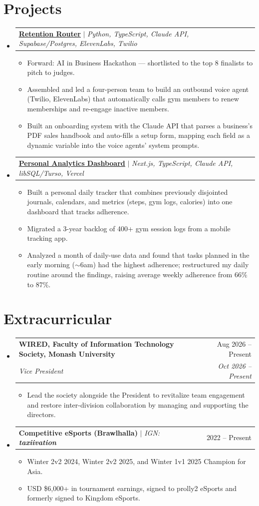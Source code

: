 \documentclass[letterpaper,11pt]{article}
\makeatletter
\newcommand{\resumeItem}[1]{\item\small{{#1 \vspace{-2pt}}}}
\newcommand{\resumeSubheading}[4]{
  \vspace{-2pt}\item
    \begin{tabular*}{0.97\textwidth}[t]{l@{\extracolsep{\fill}}r}
      \textbf{#1} & #2 \\
      \textit{\small#3} & \textit{\small #4} \\
    \end{tabular*}\vspace{-7pt}
}
\newcommand{\resumeProjectHeading}[2]{
    \item
    \begin{tabular*}{0.97\textwidth}{l@{\extracolsep{\fill}}r}
      \small#1 & #2 \\
    \end{tabular*}\vspace{-7pt}
}
\newcommand{\resumeSubHeadingListStart}{\begin{itemize}[leftmargin=0.15in, label={}]}
\newcommand{\resumeSubHeadingListEnd}{\end{itemize}}
\newcommand{\resumeItemListStart}{\begin{itemize}[itemsep=0pt]}
\newcommand{\resumeItemListEnd}{\end{itemize}\vspace{-5pt}}
\makeatother
\begin{document}
\section{Projects}
    \resumeSubHeadingListStart
      \resumeProjectHeading
          {\textbf{\href{https://github.com/taxiivation-hfp/retention-router}{\underline{Retention Router}}} $|$ \emph{Python, TypeScript, Claude API, Supabase/Postgres, ElevenLabs, Twilio}}{}
          \resumeItemListStart
            \resumeItem{Forward: AI in Business Hackathon --- shortlisted to the top 8 finalists to pitch to judges.}
            \resumeItem{Assembled and led a four-person team to build an outbound voice agent (Twilio, ElevenLabs) that automatically calls gym members to renew memberships and re-engage inactive members.}
            \resumeItem{Built an onboarding system with the Claude API that parses a business's PDF sales handbook and auto-fills a setup form, mapping each field as a dynamic variable into the voice agents' system prompts.}
          \resumeItemListEnd
      \resumeProjectHeading
          {\textbf{\href{https://github.com/taxiivation-hfp/personal-dashboard}{\underline{Personal Analytics Dashboard}}} $|$ \emph{Next.js, TypeScript, Claude API, libSQL/Turso, Vercel}}{}
          \resumeItemListStart
            \resumeItem{Built a personal daily tracker that combines previously disjointed journals, calendars, and metrics (steps, gym logs, calories) into one dashboard that tracks adherence.}
            \resumeItem{Migrated a 3-year backlog of 400+ gym session logs from a mobile tracking app.}
            \resumeItem{Analyzed a month of daily-use data and found that tasks planned in the early morning ($\sim$6am) had the highest adherence; restructured my daily routine around the findings, raising average weekly adherence from 66\% to 87\%.}
          \resumeItemListEnd
    \resumeSubHeadingListEnd

\section{Extracurricular}
  \resumeSubHeadingListStart

    \resumeSubheading
      {WIRED, Faculty of Information Technology Society, Monash University}{Aug 2026 -- Present}
      {Vice President}{Oct 2026 -- Present}
      \resumeItemListStart
        \resumeItem{Lead the society alongside the President to revitalize team engagement and restore inter-division collaboration by managing and supporting the directors.}
      \resumeItemListEnd
    \resumeProjectHeading{\textbf{Competitive eSports (Brawlhalla)} $|$ \emph{IGN: \textbf{taxiivation}}}{2022 -- Present}
      \resumeItemListStart
        \resumeItem{Winter 2v2 2024, Winter 2v2 2025, and Winter 1v1 2025 Champion for Asia.}
        \resumeItem{USD \$6,000+ in tournament earnings, signed to prolly2 eSports and formerly signed to Kingdom eSports.}
      \resumeItemListEnd
  \resumeSubHeadingListEnd
\end{document}

